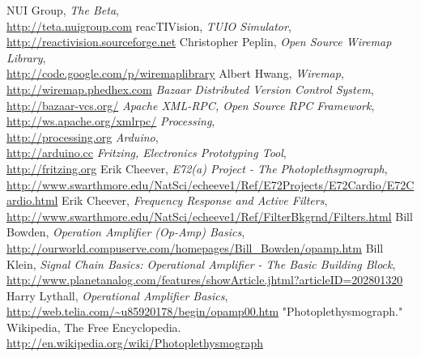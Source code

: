 \begin{thebibliography}{99}%
NUI Group, \textsl{The Beta},
\\ \mbox{}\hfill\url{http://teta.nuigroup.com}
reacTIVision, \textsl{TUIO Simulator},
\\ \mbox{}\hfill\url{http://reactivision.sourceforge.net}
Christopher Peplin, \textsl{Open Source Wiremap Library},
\\ \mbox{}\hfill\url{http://code.google.com/p/wiremaplibrary}
Albert Hwang, \textsl{Wiremap},
\\ \mbox{}\hfill\url{http://wiremap.phedhex.com}
\textsl{Bazaar Distributed Version Control System},
\\ \mbox{}\hfill\url{http://bazaar-vcs.org/}
\textsl{Apache XML-RPC, Open Source RPC Framework},
\\ \mbox{}\hfill\url{http://ws.apache.org/xmlrpc/}
\textsl{Processing}, 
\\ \mbox{}\hfill\url{http://processing.org}
\textsl{Arduino},
\\ \mbox{}\hfill\url{http://arduino.cc}
\textsl{Fritzing, Electronics Prototyping Tool},
\\ \mbox{}\hfill\url{http://fritzing.org}
Erik Cheever, \textsl{E72(a) Project - The Photoplethsymograph},
\\ \mbox{}\hfill\url{http://www.swarthmore.edu/NatSci/echeeve1/Ref/E72Projects/E72Cardio/E72Cardio.html}
Erik Cheever, \textsl{Frequency Response and Active Filters},
\\ \mbox{}\hfill\url{http://www.swarthmore.edu/NatSci/echeeve1/Ref/FilterBkgrnd/Filters.html}
Bill Bowden, \textsl{Operation Amplifier (Op-Amp) Basics},
\\ \mbox{}\hfill\url{http://ourworld.compuserve.com/homepages/Bill\_Bowden/opamp.htm}
Bill Klein, \textsl{Signal Chain Basics: Operational Amplifier - The Basic Building Block},
\\ \mbox{}\hfill\url{http://www.planetanalog.com/features/showArticle.jhtml?articleID=202801320}
Harry Lythall, \textsl{Operational Amplifier Basics},
\\ \mbox{}\hfill\url{http://web.telia.com/~u85920178/begin/opamp00.htm}
"Photoplethysmograph." Wikipedia, The Free Encyclopedia.
\\ \mbox{}\hfill\url{http://en.wikipedia.org/wiki/Photoplethysmograph}
\end{thebibliography}
